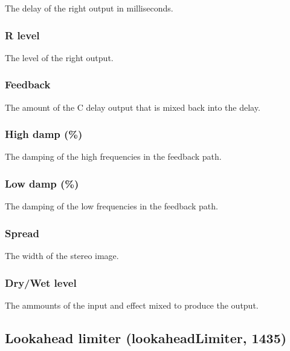 \documentclass[11pt]{article}
\begin{document}
The delay of the right output in milliseconds.\subsubsection*{R level}
The level of the right output.\subsubsection*{Feedback}
The amount of the C delay output that is mixed back into the delay.\subsubsection*{High damp (\%)}
The damping of the high frequencies in the feedback path.\subsubsection*{Low damp (\%)}
The damping of the low frequencies in the feedback path.\subsubsection*{Spread}
The width of the stereo image.\subsubsection*{Dry/Wet level}
The ammounts of the input and effect mixed to produce the output.\subsection{Lookahead limiter (lookaheadLimiter, 1435)\label{lookaheadLimiter}\label{id1435}}
\end{document}
